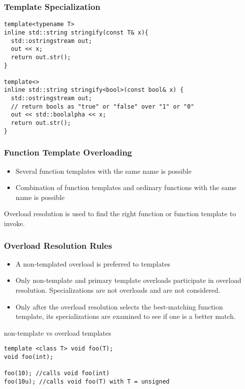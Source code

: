 \documentclass{beamer}
\begin{document}
\begin{frame}[fragile]
\frametitle{Template Specialization}
\begin{lstlisting}
template<typename T> 
inline std::string stringify(const T& x){
  std::ostringstream out;
  out << x;
  return out.str();
}

template<> 
inline std::string stringify<bool>(const bool& x) {
  std::ostringstream out;
  // return bools as "true" or "false" over "1" or "0" 
  out << std::boolalpha << x; 
  return out.str();
}

\end{lstlisting}

\end{frame}

\begin{frame}
\frametitle{Function Template Overloading}

\begin{itemize}
\item Several function templates with the same name is possible
\item Combination of function templates and ordinary functions with the same name is possible
\end{itemize}

Overload resolution is used to find the right function or function template to invoke.

\end{frame}

\begin{frame}[fragile]
\frametitle{Overload Resolution Rules}

\begin{itemize}
\item A non-templated overload is preferred to templates
\item Only non-template and primary template overloads participate in overload resolution. Specializations are not overloads and are not considered.
\item Only after the overload resolution selects the best-matching function template, its specializations are examined to see if one is a better match.
\end{itemize}

\begin{block}{non-template vs overload templates}
\begin{lstlisting}
template <class T> void foo(T);
void foo(int);

foo(10); //calls void foo(int)
foo(10u); //calls void foo(T) with T = unsigned
\end{lstlisting}
\end{block}

\end{frame}
\end{document}
